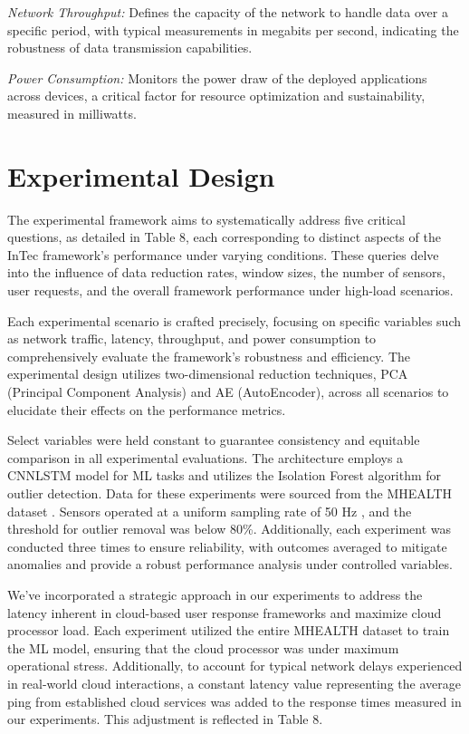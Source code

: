 \documentclass[11pt]{article}
\begin{document}
	\textit{Network Throughput:} Defines the capacity of the network to handle data over a
	specific period, with typical measurements in megabits per second, indicating
	the robustness of data transmission capabilities.
	
	
	\textit{Power Consumption:} Monitors the power draw of the deployed applications
	across devices, a critical factor for resource optimization and sustainability,
	measured in milliwatts.
	
	\section{Experimental Design}
	The experimental framework aims to systematically address five critical questions,
	as detailed in Table 8, each corresponding to distinct aspects of the InTec framework’s performance under varying conditions. These queries delve into the influence of data reduction rates, window sizes, the number of sensors, user requests, and the overall framework performance under high-load scenarios.
	
	Each experimental scenario is crafted precisely, focusing on specific variables
	such as network traffic, latency, throughput, and power consumption to comprehensively evaluate the framework’s robustness and efficiency. The experimental design
	utilizes two-dimensional reduction techniques, PCA (Principal Component Analysis) and AE (AutoEncoder), across all scenarios to elucidate their effects on the performance metrics.
	
	Select variables were held constant to guarantee consistency and equitable
	comparison in all experimental evaluations. The architecture employs a CNNLSTM model for ML tasks \cite{c32} and utilizes the Isolation Forest algorithm for
	outlier detection. Data for these experiments were sourced from the MHEALTH
	dataset \cite{c15}. Sensors operated at a uniform sampling rate of 50 Hz \cite{c18}, and the
	threshold for outlier removal was below 80\%. Additionally, each experiment was
	conducted three times to ensure reliability, with outcomes averaged to mitigate
	anomalies and provide a robust performance analysis under controlled variables.
	
	We’ve incorporated a strategic approach in our experiments to address the
	latency inherent in cloud-based user response frameworks and maximize cloud
	processor load. Each experiment utilized the entire MHEALTH dataset to train
	the ML model, ensuring that the cloud processor was under maximum operational stress. Additionally, to account for typical network delays experienced in
	real-world cloud interactions, a constant latency value representing the average
	ping from established cloud services was added to the response times measured
	in our experiments. This adjustment is reflected in Table 8.
	
\end{document}
